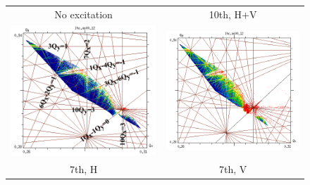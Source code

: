 \documentclass[
prstab
,reprint
,linenumbers
,longbibliography
,preprintnumbers
,showkeys
,amsfonts,amssymb,amsmath
,floatfix
]{revtex4-1}
\newlength{\fmawidth}
\begin{document}
\begin{figure}
  \begin{tabular}{cc}
    No excitation & 10th, H+V \\
    \includegraphics[width=\fmawidth]{2016injnocolc15o+19_6noerru_dp0_ord10_annotate.png} &
    \includegraphics[width=\fmawidth]{2016injnocolc15o+19_6noerrut10skhv_dp0_ord10.png}
    \\
    7th, H & 7th, V \\

\end{tabular}
\end{figure}
\end{document}
